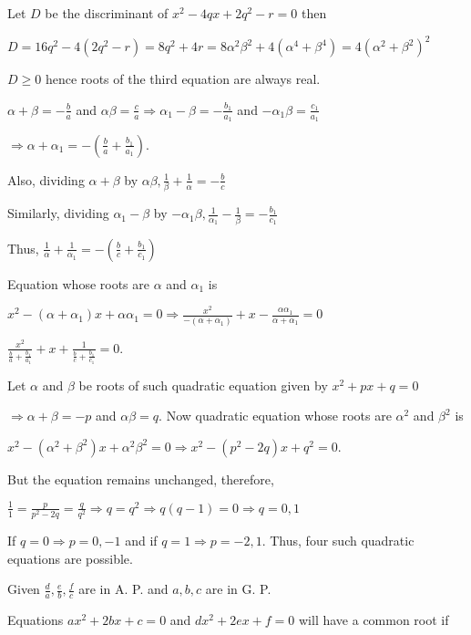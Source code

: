   Let $D$ be the discriminant of $x^2 - 4qx + 2q^2 - r = 0$ then

  $D = 16q^2 - 4(2q^2 - r) = 8q^2 + 4r = 8\alpha^2\beta^2 + 4(\alpha^4 + \beta^4) = 4(\alpha^2 + \beta^2)^2$

  $D \ge 0$ hence roots of the third equation are always real.
\item $\alpha + \beta = -\frac{b}{a}$ and $\alpha\beta = \frac{c}{a}\Rightarrow \alpha_1 - \beta =
  -\frac{b_1}{a_1}$ and $-\alpha_1\beta = \frac{c_1}{a_1}$

  $\Rightarrow \alpha + \alpha_1 = -\left(\frac{b}{a} + \frac{b_1}{a_1}\right)$.

  Also, dividing $\alpha + \beta$ by $\alpha\beta, \frac{1}{\beta} + \frac{1}{\alpha} = -\frac{b}{c}$

  Similarly, dividing $\alpha_1 - \beta$ by $-\alpha_1\beta, \frac{1}{\alpha_1} - \frac{1}{\beta} =
  -\frac{b_1}{c_1}$

  Thus, $\frac{1}{\alpha} + \frac{1}{\alpha_1} = -\left(\frac{b}{c} + \frac{b_1}{c_1}\right)$

  Equation whose roots are $\alpha$ and $\alpha_1$ is

  $x^2 - (\alpha + \alpha_1)x + \alpha\alpha_1 = 0\Rightarrow \frac{x^2}{-(\alpha + \alpha_1)} + x -
  \frac{\alpha\alpha_1}{\alpha + \alpha_1} = 0$

  $\frac{x^2}{\frac{b}{a} + \frac{b_1}{a_1}} + x + \frac{1}{\frac{b}{c} + \frac{b_1}{c_1}} = 0$.
\item Let $\alpha$ and $\beta$ be roots of such quadratic equation given by $x^2 + px + q = 0$

  $\Rightarrow \alpha + \beta = -p$ and $\alpha\beta = q$. Now quadratic equation whose roots are $\alpha^2$
  and $\beta^2$ is

  $x^2 - (\alpha^2 + \beta^2)x + \alpha^2\beta^2 = 0\Rightarrow x^2 - (p^2 - 2q)x + q^2 = 0$.

  But the equation remains unchanged, therefore,

  $\frac{1}{1} = \frac{p}{p^2 - 2q} = \frac{q}{q^2}\Rightarrow q = q^2 \Rightarrow q(q - 1) = 0 \Rightarrow
  q = 0, 1$

  If $q = 0 \Rightarrow p = 0, -1$ and if $q = 1 \Rightarrow p = -2, 1$. Thus, four such quadratic equations
  are possible.
\item Given $\frac{d}{a}, \frac{e}{b}, \frac{f}{c}$ are in A. P. and $a, b, c$ are in G. P.

  Equations $ax^2 + 2bx + c = 0$ and $dx^2 + 2ex + f = 0$ will have a common root if

